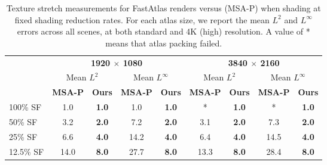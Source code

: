 \begin{table}
\scriptsize
\setlength{\tabcolsep}{2pt}
\centering
\begin{tabular}{l|cc|cc||cc|cc}
& \multicolumn{4}{c||}{\textbf{1920 $\times$ 1080}} & \multicolumn{4}{c}{\textbf{3840 $\times$ 2160}} \\
& \multicolumn{2}{c|}{Mean $L^2$} & \multicolumn{2}{c||}{Mean $L^\infty$} & \multicolumn{2}{c|}{Mean $L^2$} & \multicolumn{2}{c}{Mean $L^\infty$} \\
& \textbf{MSA-P} & \textbf{Ours} & \textbf{MSA-P} & \textbf{Ours} & \textbf{MSA-P} & \textbf{Ours} & \textbf{MSA-P} & \textbf{Ours} \\
\hline
100\% SF & 1.0 & \textbf{1.0} & 1.0 & \textbf{1.0} & * & \textbf{1.0} & * & \textbf{1.0} \\
50\% SF & 3.2 & \textbf{2.0} & 7.2 & \textbf{2.0} & 3.1 & \textbf{2.0} & 7.3 & \textbf{2.0} \\
25\% SF & 6.6 & \textbf{4.0} & 14.2 & \textbf{4.0} & 6.4 & \textbf{4.0} & 14.5 & \textbf{4.0} \\
12.5\% SF & 14.0 & \textbf{8.0} & 27.7 & \textbf{8.0} & 13.3       & \textbf{8.0} & 28.4 & \textbf{8.0} \\ 
\end{tabular}
\caption{Texture stretch measurements \cite{sander2001texture} for FastAtlas renders versus \cite{Neff2022MSA} (MSA-P) when shading at fixed shading reduction rates. For each atlas size, we report the mean $L^2$ and $L^\infty$ errors across all scenes, at both standard and 4K (high) resolution. A value of * means that atlas packing failed.}\
\label{tab:stretch_fixed_sr}
\vspace{-3mm}
\end{table}

